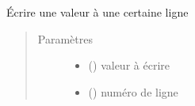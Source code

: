 \documentclass[letterpaper,10pt,french]{sphinxmanual}
\begin{document}
\begin{fulllineitems}
\begin{fulllineitems}
\label{\detokenize{widgets:widgets.MemoryWidget.writeValueInLine}}
Écrire une valeur à une certaine ligne
\begin{quote}\begin{description}
\item[{Paramètres}] \leavevmode\begin{itemize}
\item {} 
 ({\hyperref[\detokenize{executeurcomponents:executeurcomponents.DataValue}]{}}) \textendash{} valeur à écrire

\item {} 
 () \textendash{} numéro de ligne

\end{itemize}

\end{description}\end{quote}

\end{fulllineitems}


\end{fulllineitems}

\end{document}
